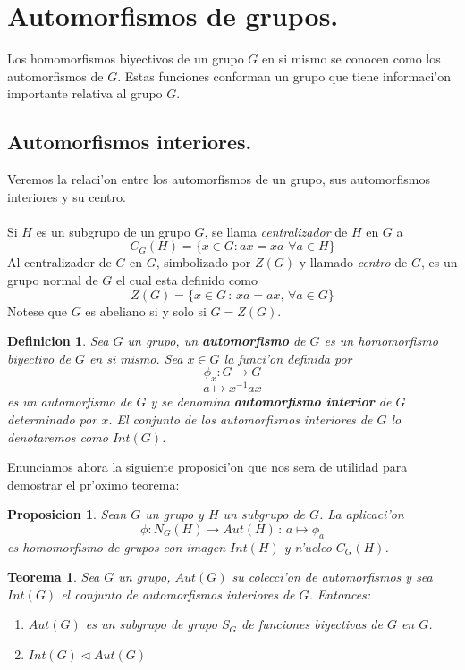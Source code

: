 \documentclass[a4paper,openright,12pt]{book}
\numberwithin{equation}{section} %
\newtheorem{teorema}{Teorema}[section] %
\newtheorem{proposicion}{Proposicion}[section] %
\newtheorem{definicion}{Definicion}[section] %
\begin{document}
\section{Automorfismos de grupos.}
Los homomorfismos biyectivos de un grupo $G$ en si mismo se conocen como los automorfismos de $G$. Estas funciones conforman un grupo que tiene informaci'on importante relativa al grupo $G$.
\subsection{Automorfismos interiores.}
Veremos la relaci'on entre los automorfismos de un grupo, sus automorfismos interiores y su centro.\\
\\
Si $H$ es un subgrupo de un grupo $G$, se llama \textit{centralizador} de $H$ en $G$ a
\[
C_{G}(H)=\{ x \in G : ax = xa \,\, \forall a \in H \}
\]
Al centralizador de $G$ en $G$, simbolizado por $Z(G)$ y llamado \textit{centro} de $G$, es un grupo normal de $G$ el cual esta definido como
\[
Z(G)=\{ x \in G\, : \, xa=ax, \, \forall a \in G \}
\] 
Notese que $G$ es abeliano si y solo si $G=Z(G)$.
\begin{definicion}
Sea $G$ un grupo, un \textbf{automorfismo} de $G$ es un homomorfismo biyectivo de $G$ en si mismo. Sea $x \in G$ la funci'on definida por
\[
\phi_{x}:G \rightarrow G
\]
\[
a \mapsto x^{-1}ax
\]
es un automorfismo de $G$ y se denomina \textbf{automorfismo interior} de $G$ determinado por $x$. El conjunto de los automorfismos interiores de $G$ lo denotaremos como $Int(G)$.
\end{definicion}
Enunciamos ahora la siguiente proposici'on que nos sera de utilidad para demostrar el pr'oximo teorema:
\begin{proposicion}
Sean $G$ un grupo y $H$ un subgrupo de $G$. La aplicaci'on 
\[
\phi : N_{G}(H) \rightarrow Aut(H) \, : \, a \mapsto \phi_{a}
\]
es homomorfismo de grupos con imagen $Int(H)$ y n'ucleo $C_{G}(H)$.
\end{proposicion}
\begin{teorema}
Sea $G$ un grupo, $Aut(G)$ su colecci'on de automorfismos y sea $Int(G)$ el conjunto de automorfismos interiores de $G$. Entonces:
\begin{enumerate}
\item $Aut(G)$ es un subgrupo de grupo $S_{G}$ de funciones biyectivas de $G$ en $G$.
\item $Int(G) \triangleleft Aut(G)$
\end{enumerate}
\end{teorema}
\end{document}
